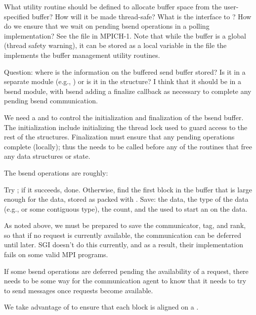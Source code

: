 \documentclass{article}
\begin{document}
What utility routine should be defined to allocate buffer space from the
user-specified buffer?  How will it be made thread-safe?  What is the
interface to ?  How do we ensure that we wait on
pending bsend operations in a polling implementation?  See the file
 in MPICH-1.  Note that while the buffer is
a global (thread safety warning),
it can be stored as a local 
 variable in the file the implements the buffer
management utility routines.

Question: where is the information on the buffered send buffer stored?
Is it in a separate module (e.g., ) or is it in the
 structure?  I think that it should be in a bsend
module, with bsend adding a finalize callback as necessary to complete
any pending bsend communication.

We need a  and
 to control the initialization and
finalization of the bsend buffer.  The initialization include
initializing the thread lock used to guard access to the rest of the
structures.   Finalization must ensure that any pending operations
complete (locally); thus the  needs to
be called before any of the routines that free any data structures or state.

The bsend operations are roughly:

Try ; if it succeeds, done.
Otherwise, find the first block in the buffer that is large enough for
the data, stored as packed with .  
Save: the data, the type of the data (e.g.,  or some
contiguous type), the count, and the  used to start
an  on the data.

As noted above, we must be prepared to save the
communicator, tag, and rank, so that if no request is currently
available, the communication can be deferred until later.  SGI doesn't
do this currently, and as a result, their implementation fails on some
valid MPI programs.

If some bsend operations are deferred pending the availability of a
request, there needs to be some way for the communication agent to
know that it needs to try to send messages once requests become
available.


We take advantage of  to ensure that each
block is aligned on a .
\end{document}
